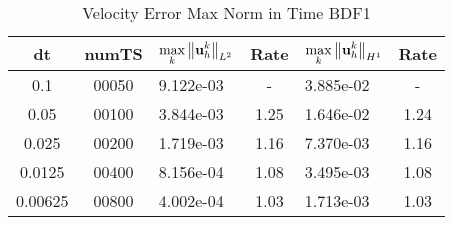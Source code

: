 \documentclass[letterpaper]{erdc}
\begin{document}
%

\begin{table}[h!]
  \begin{center}
    \caption{Velocity Error Max Norm in Time BDF1}
    \begin{tabular}{c|c|l|c|l|c}
      dt & numTS &  $\displaystyle\max_{k} \left\|\textbf{u}^{k}_{h}\right\|_{L^2}$ &  Rate  &  $\displaystyle\max_{k} \left\|\textbf{u}^{k}_{h}\right\|_{H^1}$ &  Rate\\
      \hline
      0.1     & 00050 & 9.122e-03 &   -  & 3.885e-02 &  -  \\
      0.05    & 00100 & 3.844e-03 & 1.25 & 1.646e-02 & 1.24\\
      0.025   & 00200 & 1.719e-03 & 1.16 & 7.370e-03 & 1.16\\
      0.0125  & 00400 & 8.156e-04 & 1.08 & 3.495e-03 & 1.08\\
      0.00625 & 00800 & 4.002e-04 & 1.03 & 1.713e-03 & 1.03
    \end{tabular}
  \end{center}
\end{table}
\end{document}
